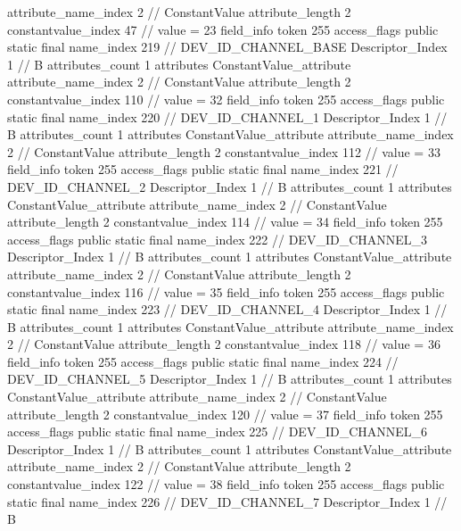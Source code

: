 {{{{{{{					attribute_name_index	2		// ConstantValue
					attribute_length	2
					constantvalue_index	47		// value = 23
				}
				}
			}
			field_info {
				token	255
				access_flags	public static final
				name_index	219		// DEV_ID_CHANNEL_BASE
				Descriptor_Index	1		// B
				attributes_count	1
				attributes {
				ConstantValue_attribute {
					attribute_name_index	2		// ConstantValue
					attribute_length	2
					constantvalue_index	110		// value = 32
				}
				}
			}
			field_info {
				token	255
				access_flags	public static final
				name_index	220		// DEV_ID_CHANNEL_1
				Descriptor_Index	1		// B
				attributes_count	1
				attributes {
				ConstantValue_attribute {
					attribute_name_index	2		// ConstantValue
					attribute_length	2
					constantvalue_index	112		// value = 33
				}
				}
			}
			field_info {
				token	255
				access_flags	public static final
				name_index	221		// DEV_ID_CHANNEL_2
				Descriptor_Index	1		// B
				attributes_count	1
				attributes {
				ConstantValue_attribute {
					attribute_name_index	2		// ConstantValue
					attribute_length	2
					constantvalue_index	114		// value = 34
				}
				}
			}
			field_info {
				token	255
				access_flags	public static final
				name_index	222		// DEV_ID_CHANNEL_3
				Descriptor_Index	1		// B
				attributes_count	1
				attributes {
				ConstantValue_attribute {
					attribute_name_index	2		// ConstantValue
					attribute_length	2
					constantvalue_index	116		// value = 35
				}
				}
			}
			field_info {
				token	255
				access_flags	public static final
				name_index	223		// DEV_ID_CHANNEL_4
				Descriptor_Index	1		// B
				attributes_count	1
				attributes {
				ConstantValue_attribute {
					attribute_name_index	2		// ConstantValue
					attribute_length	2
					constantvalue_index	118		// value = 36
				}
				}
			}
			field_info {
				token	255
				access_flags	public static final
				name_index	224		// DEV_ID_CHANNEL_5
				Descriptor_Index	1		// B
				attributes_count	1
				attributes {
				ConstantValue_attribute {
					attribute_name_index	2		// ConstantValue
					attribute_length	2
					constantvalue_index	120		// value = 37
				}
				}
			}
			field_info {
				token	255
				access_flags	public static final
				name_index	225		// DEV_ID_CHANNEL_6
				Descriptor_Index	1		// B
				attributes_count	1
				attributes {
				ConstantValue_attribute {
					attribute_name_index	2		// ConstantValue
					attribute_length	2
					constantvalue_index	122		// value = 38
				}
				}
			}
			field_info {
				token	255
				access_flags	public static final
				name_index	226		// DEV_ID_CHANNEL_7
				Descriptor_Index	1		// B
}}}}}
